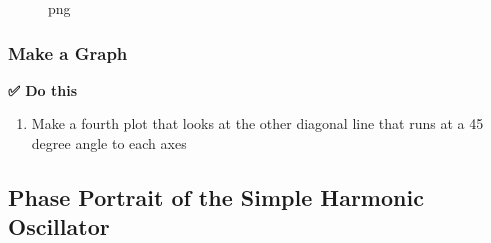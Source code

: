 \begin{figure}
\centering
{}
\caption{png}
\end{figure}

\subsubsection{Make a Graph}\label{make-a-graph}

\textbf{✅ Do this}

\begin{enumerate}
\def\labelenumi{\arabic{enumi}.}
\tightlist
\item
  Make a fourth plot that looks at the other diagonal line that runs at
  a 45 degree angle to each axes
\end{enumerate}

\begin{Shaded}
\begin{Highlighting}[]
\end{Highlighting}
\end{Shaded}

\subsection{Phase Portrait of the Simple Harmonic
Oscillator}\label{phase-portrait-of-the-simple-harmonic-oscillator}

